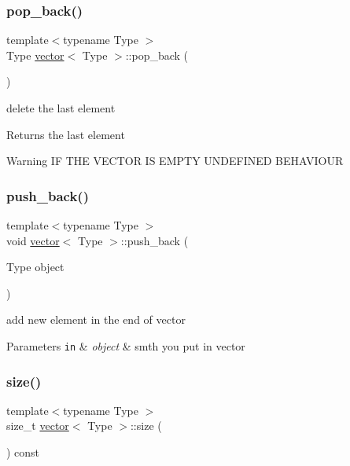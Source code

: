 \subsubsection{\texorpdfstring{pop\+\_\+back()}{pop\_back()}}
{\footnotesize\ttfamily template$<$typename Type $>$ \\
Type \hyperlink{classvector}{vector}$<$ Type $>$\+::pop\+\_\+back (\begin{DoxyParamCaption}{ }\end{DoxyParamCaption})}

delete the last element \begin{DoxyReturn}{Returns}
the last element 
\end{DoxyReturn}
\begin{DoxyWarning}{Warning}
IF T\+HE V\+E\+C\+T\+OR IS E\+M\+P\+TY U\+N\+D\+E\+F\+I\+N\+ED B\+E\+H\+A\+V\+I\+O\+UR 
\end{DoxyWarning}
\mbox{\label{classvector_a7969701b971bcceeba65b2150ea4a1a4}} 
\subsubsection{\texorpdfstring{push\+\_\+back()}{push\_back()}}
{\footnotesize\ttfamily template$<$typename Type $>$ \\
void \hyperlink{classvector}{vector}$<$ Type $>$\+::push\+\_\+back (\begin{DoxyParamCaption}\item[{Type}]{object }\end{DoxyParamCaption})}

add new element in the end of vector 
\begin{DoxyParams}[1]{Parameters}
\mbox{\tt in}  & {\em object} & smth you put in vector \\
\hline
\end{DoxyParams}
\mbox{\label{classvector_a93899e95a36d1f3a24cc0e97314d9846}} 
\subsubsection{\texorpdfstring{size()}{size()}}
{\footnotesize\ttfamily template$<$typename Type $>$ \\
size\+\_\+t \hyperlink{classvector}{vector}$<$ Type $>$\+::size (\begin{DoxyParamCaption}{ }\end{DoxyParamCaption}) const}

